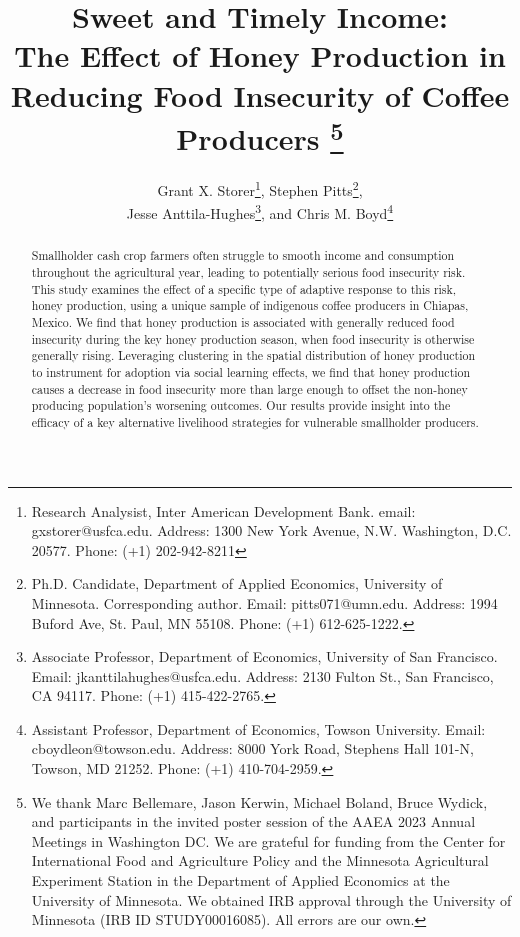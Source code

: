 \begin{titlepage}

\title{Sweet and Timely Income: \\
The Effect of Honey Production in Reducing Food Insecurity of Coffee Producers
\thanks{We thank Marc Bellemare, Jason Kerwin, Michael Boland, 
Bruce Wydick, and 
participants in the invited poster session of the AAEA 2023 Annual Meetings in
Washington DC. We are grateful for funding from the 
Center for International
Food and Agriculture Policy and the Minnesota
Agricultural Experiment Station in the Department of Applied
Economics at the University of Minnesota. We obtained
IRB approval through the University of Minnesota 
(IRB ID STUDY00016085). All errors are our own.}}
\author{Grant X. Storer\thanks{Research Analysist, Inter American Development Bank. email: gxstorer@usfca.edu. Address: 1300 New York
Avenue, N.W. Washington, D.C. 20577. Phone: (+1) 202-942-8211}, Stephen Pitts\thanks{Ph.D. Candidate, Department of Applied Economics, University of Minnesota. Corresponding author. Email: pitts071@umn.edu. Address: 1994 Buford Ave, St. Paul, MN 55108. Phone: (+1) 612-625-1222.}, \\ Jesse Anttila-Hughes\thanks{Associate Professor, Department of Economics, University of San Francisco. Email: jkanttilahughes@usfca.edu. Address: 2130 Fulton St., San Francisco, CA 94117. Phone: (+1) 415-422-2765.}, and
Chris M. Boyd\thanks{Assistant Professor, Department of Economics, Towson University. Email: cboydleon@towson.edu. Address: 8000 York Road, Stephens Hall 101-N, Towson, MD 21252. Phone: (+1) 410-704-2959.}}  

\maketitle

\begin{abstract}
Smallholder cash crop farmers often struggle to smooth income and consumption throughout the agricultural year, leading to potentially serious food insecurity risk. This study examines the effect of a specific type of adaptive response to this risk, honey production, using a unique sample of indigenous coffee producers in Chiapas, Mexico. We find that honey production is associated with generally reduced food insecurity during the key honey production season, when food insecurity is otherwise generally rising. Leveraging  clustering in the spatial distribution of honey production to instrument for adoption via social learning effects, we find that honey production causes a decrease in food insecurity more than large enough to offset the non-honey producing population's worsening outcomes. Our results provide insight into the efficacy of a key alternative livelihood strategies for vulnerable smallholder producers. 



\end{abstract}
\end{titlepage}
